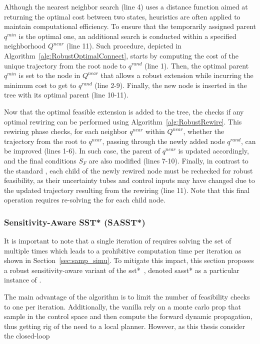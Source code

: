 Although the nearest neighbor search (line 4) uses a distance function aimed at returning the optimal cost between two states, heuristics are often applied to maintain computational efficiency.
To ensure that the temporarily assigned parent $q^{min}$ is the optimal one, an additional search is conducted within a specified neighborhood $Q^{near}$ (line 11).
Such procedure, depicted in Algorithm~\ref{alg:RobustOptimalConnect}, starts by computing the cost of the unique trajectory from the root node to $q^{rand}$ (line 1).
Then, the optimal parent $q^{min}$ is set to the node in $Q^{near}$ that allows a robust extension while incurring the minimum cost to get to $q^{rand}$ (line 2-9).
Finally, the new node is inserted in the tree with its optimal parent (line 10-11).

Now that the optimal feasible extension is added to the tree, the  checks if any optimal rewiring can be performed using Algorithm~\ref{alg:RobustRewire}.
This rewiring phase checks, for each neighbor $q^{near}$ within $Q^{near}$, whether the trajectory from the root to $q^{near}$, passing through the newly added node $q^{rand}$, can be improved (lines 1-6).
In such case, the parent of $q^{near}$ is updated accordingly, and the final  conditions $S_F$ are also modified (lines 7-10).
Finally, in contrast to the standard , each child of the newly rewired node must be rechecked for robust feasibility, as their uncertainty tubes and control inputs may have changed due to the updated trajectory resulting from the rewiring (line 11).
Note that this final operation requires re-solving the  for each child node.

\subsubsection{Sensitivity-Aware SST* (SASST*)}

It is important to note that a single iteration of  requires solving the set of  multiple times which leads to a prohibitive computation time per iteration as shown in Section~\ref{sec:samp_simu}.
To mitigate this impact, this section proposes a robust sensitivity-aware variant of the \gls{sst*}~\cite{cSST}, denoted \gls{sasst*} as a particular instance of . 

The main advantage of the  algorithm is to limit the number of feasibility checks to one per iteration.
Additionally, the vanilla  rely on a monte carlo prop that sample in the control space and then compute the forward dynamic propagation, thus getting rig of the need to a local planner. 
However, as this thesis consider the closed-loop  

